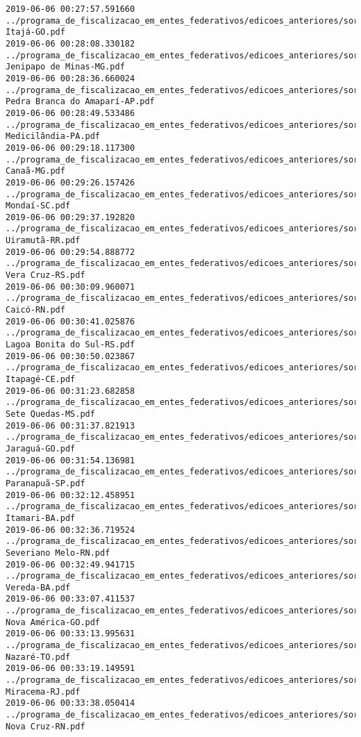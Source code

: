 \begin{lstlisting}
2019-06-06 00:27:57.591660 ../programa_de_fiscalizacao_em_entes_federativos/edicoes_anteriores/sorteio_40/3429-Itajá-GO.pdf
2019-06-06 00:28:08.330182 ../programa_de_fiscalizacao_em_entes_federativos/edicoes_anteriores/sorteio_40/3364-Jenipapo de Minas-MG.pdf
2019-06-06 00:28:36.660024 ../programa_de_fiscalizacao_em_entes_federativos/edicoes_anteriores/sorteio_40/3372-Pedra Branca do Amaparí-AP.pdf
2019-06-06 00:28:49.533486 ../programa_de_fiscalizacao_em_entes_federativos/edicoes_anteriores/sorteio_40/3392-Medicilândia-PA.pdf
2019-06-06 00:29:18.117300 ../programa_de_fiscalizacao_em_entes_federativos/edicoes_anteriores/sorteio_40/3368-Canaã-MG.pdf
2019-06-06 00:29:26.157426 ../programa_de_fiscalizacao_em_entes_federativos/edicoes_anteriores/sorteio_40/3438-Mondaí-SC.pdf
2019-06-06 00:29:37.192820 ../programa_de_fiscalizacao_em_entes_federativos/edicoes_anteriores/sorteio_40/3374-Uiramutã-RR.pdf
2019-06-06 00:29:54.888772 ../programa_de_fiscalizacao_em_entes_federativos/edicoes_anteriores/sorteio_40/3344-Vera Cruz-RS.pdf
2019-06-06 00:30:09.960071 ../programa_de_fiscalizacao_em_entes_federativos/edicoes_anteriores/sorteio_40/3398-Caicó-RN.pdf
2019-06-06 00:30:41.025876 ../programa_de_fiscalizacao_em_entes_federativos/edicoes_anteriores/sorteio_40/3340-Lagoa Bonita do Sul-RS.pdf
2019-06-06 00:30:50.023867 ../programa_de_fiscalizacao_em_entes_federativos/edicoes_anteriores/sorteio_40/3403-Itapagé-CE.pdf
2019-06-06 00:31:23.682858 ../programa_de_fiscalizacao_em_entes_federativos/edicoes_anteriores/sorteio_40/3386-Sete Quedas-MS.pdf
2019-06-06 00:31:37.821913 ../programa_de_fiscalizacao_em_entes_federativos/edicoes_anteriores/sorteio_40/3433-Jaraguá-GO.pdf
2019-06-06 00:31:54.136981 ../programa_de_fiscalizacao_em_entes_federativos/edicoes_anteriores/sorteio_40/3350-Paranapuã-SP.pdf
2019-06-06 00:32:12.458951 ../programa_de_fiscalizacao_em_entes_federativos/edicoes_anteriores/sorteio_40/3328-Itamari-BA.pdf
2019-06-06 00:32:36.719524 ../programa_de_fiscalizacao_em_entes_federativos/edicoes_anteriores/sorteio_40/3401-Severiano Melo-RN.pdf
2019-06-06 00:32:49.941715 ../programa_de_fiscalizacao_em_entes_federativos/edicoes_anteriores/sorteio_40/3334-Vereda-BA.pdf
2019-06-06 00:33:07.411537 ../programa_de_fiscalizacao_em_entes_federativos/edicoes_anteriores/sorteio_40/3435-Nova América-GO.pdf
2019-06-06 00:33:13.995631 ../programa_de_fiscalizacao_em_entes_federativos/edicoes_anteriores/sorteio_40/3396-Nazaré-TO.pdf
2019-06-06 00:33:19.149591 ../programa_de_fiscalizacao_em_entes_federativos/edicoes_anteriores/sorteio_40/3378-Miracema-RJ.pdf
2019-06-06 00:33:38.050414 ../programa_de_fiscalizacao_em_entes_federativos/edicoes_anteriores/sorteio_40/3399-Nova Cruz-RN.pdf

\end{lstlisting}
